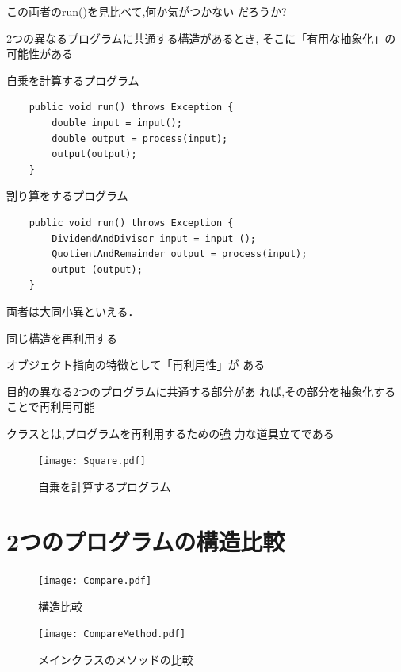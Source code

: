 \documentclass[a4j, twoside]{jsbook}
\begin{document}
この両者のrun()を見比べて,何か気がつかない
だろうか?

 2つの異なるプログラムに共通する構造があるとき,
そこに「有用な抽象化」の可能性がある

自乗を計算するプログラム

\begin{verbatim}
	public void run() throws Exception {
	    double input = input();
	    double output = process(input);
	    output(output);
	}
\end{verbatim}

割り算をするプログラム

\begin{verbatim}
	public void run() throws Exception {
	    DividendAndDivisor input = input ();
	    QuotientAndRemainder output = process(input);
	    output (output);
	}
\end{verbatim}

両者は大同小異といえる．

同じ構造を再利用する

オブジェクト指向の特徴として「再利用性」が
ある

 目的の異なる2つのプログラムに共通する部分があ
れば,その部分を抽象化することで再利用可能

クラスとは,プログラムを再利用するための強
力な道具立てである

\begin{figure}
 \begin{center}
  \texttt{[image: Square.pdf]}
  \caption{自乗を計算するプログラム}
 \end{center}
\end{figure}

\section{2つのプログラムの構造比較}

\begin{figure}
 \begin{center}
  \texttt{[image: Compare.pdf]}
  \caption{構造比較}
 \end{center}
\end{figure}

\begin{figure}
 \begin{center}
  \texttt{[image: CompareMethod.pdf]}
  \caption{メインクラスのメソッドの比較}
 \end{center}
\end{figure}
\end{document}
